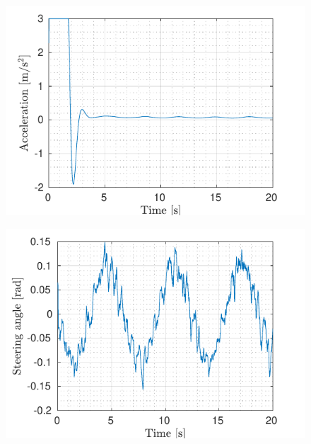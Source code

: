 \begin{figure}[!h]
\begin{minipage}[t]{0.5\textwidth}
		\includegraphics[width=\textwidth]{../../MATLAB/lane_following/figure/AccelerationVsTime.pdf}
		\label{fig:acceleration_laneFollowing}
	\end{minipage}
	\begin{minipage}[t]{0.5\textwidth}
		\includegraphics[width=\textwidth]{../../MATLAB/lane_following/figure/SteeringAngleVsTime.pdf}
		\label{fig:steering_laneFollowing}
	\end{minipage}
	\begin{minipage}[t]{0.5\textwidth}

\end{minipage}
\end{figure}

